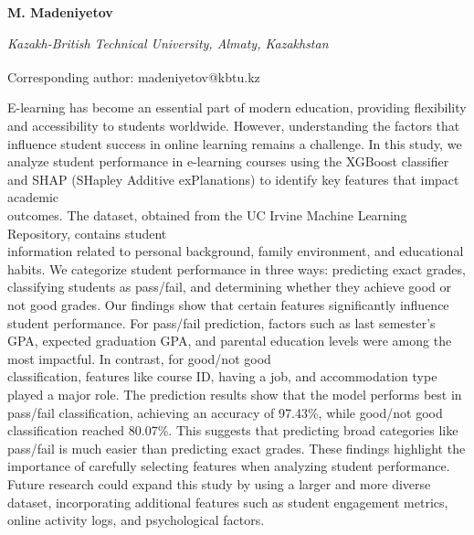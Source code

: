 
\begin{articleheader}

{\bfseries M. Madeniyetov}
\end{articleheader}

\begin{affiliation}
\emph{Kazakh-British Technical University, Almaty, Kazakhstan}

\raggedright \textsuperscript{\envelope }Corresponding author: madeniyetov@kbtu.kz
\end{affiliation}

E-learning has become an essential part of modern education, providing
flexibility and accessibility to students worldwide. However,
understanding the factors that influence student success in online
learning remains a challenge. In this study, we analyze student
performance in e-learning courses using the XGBoost classifier and SHAP
(SHapley Additive exPlanations) to identify key features that impact
academic \\outcomes. The dataset, obtained from the UC Irvine Machine
Learning Repository, contains student \\information related to personal
background, family environment, and educational habits. We categorize
student performance in three ways: predicting exact grades, classifying
students as pass/fail, and determining whether they achieve good or not
good grades. Our findings show that certain features significantly
influence student performance. For pass/fail prediction, factors such as
last semester's GPA, expected graduation GPA, and parental education
levels were among the most impactful. In contrast, for good/not good\\
classification, features like course ID, having a job, and accommodation
type played a major role. The prediction results show that the model
performs best in pass/fail classification, achieving an accuracy of
97.43\%, while good/not good classification reached 80.07\%. This
suggests that predicting broad categories like pass/fail is much easier
than predicting exact grades. These findings highlight the importance of
carefully selecting features when analyzing student performance. Future
research could expand this study by using a larger and more diverse
dataset, incorporating additional features such as student engagement
metrics, online activity logs, and psychological factors.

